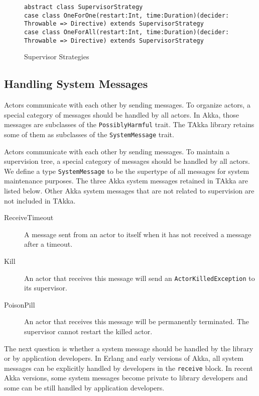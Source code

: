 \begin{figure}
\label{super}
    \begin{lstlisting}    
abstract class SupervisorStrategy
case class OneForOne(restart:Int, time:Duration)(decider: Throwable => Directive) extends SupervisorStrategy
case class OneForAll(restart:Int, time:Duration)(decider: Throwable => Directive) extends SupervisorStrategy
    \end{lstlisting}
    \caption{Supervisor Strategies}
\end{figure}


\subsection{Handling System Messages}
\label{systemmessage}
Actors communicate with each other by sending messages.  To organize actors, a 
special category of messages should be handled by all actors.  In Akka, those 
messages are subclasses of the {\tt PossiblyHarmful} trait.  The TAkka library 
retains some of them as subclasses of the {\tt SystemMessage} trait.

Actors communicate with each other by sending messages.  To maintain a
supervision tree, a special category of messages should be handled by all 
actors.  We define a type {\tt SystemMessage} to be the supertype of all 
messages for system maintenance purposes.  The three Akka system messages 
retained in TAkka are listed below.  Other Akka system messages that are not 
related to supervision are not included in TAkka.


\begin{description}
  \item[ReceiveTimeout] A message sent from an actor to itself when it has not received a message
after a timeout.
  \item[Kill] An actor that receives this message will send an {\tt ActorKilledException} to its supervisor.
  \item[PoisonPill] An actor that receives this message will be 
permanently terminated.  The supervisor cannot restart the killed actor.
\end{description}


The next question is whether a system message should be handled by the library 
or by application developers.  In Erlang and early versions of Akka, all
system messages can be explicitly handled by developers in the {\tt receive}
block.  In recent Akka versions, some system messages become private to library 
developers and some can be still handled by application developers.


